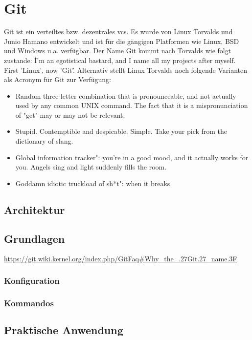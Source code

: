 \chapter{Git}\label{cha:Git}
Git ist ein verteiltes bzw. dezentrales \acrlong{vcs}. Es wurde von Linux
Torvalds und Junio Hamano entwickelt und ist für die gängigen Platformen wie
Linux, BSD und Windows u.a. verfügbar. Der Name Git kommt nach Torvalds wie
folgt zustande: \`I'm an egotistical bastard, and I name all my projects after
myself. First 'Linux', now 'Git'\'. Alternativ stellt Linux Torvalds noch
folgende Varianten als Acronym für Git zur Verfügung\cite{link:gitfaq}:

\begin{itemize}
  \item \glqq{} Random three-letter combination that is pronounceable, and not
  actually used by any common UNIX command. The fact that it is a
  mispronunciation of "get" may or may not be relevant.\grqq{}
  \item \glqq{} Stupid. Contemptible and despicable. Simple. Take your pick from the
  dictionary of slang.\grqq{}
  \item \glqq{} Global information tracker": you're in a good mood, and it actually
  works for you. Angels sing and light suddenly fills the room.\grqq{}
  \item \glqq{} Goddamn idiotic truckload of sh*t": when it breaks\grqq{}
\end{itemize}
\section{Architektur}
\label{sec:Architektur}
\section{Grundlagen}
\label{sec:Grundlagen}


\url{https://git.wiki.kernel.org/index.php/GitFaq#Why_the_.27Git.27_name.3F}
\subsection{Konfiguration}
\label{sec:Konfiguration}
\subsection{Kommandos}
\label{sec:Kommandos}
\section{Praktische Anwendung}
\label{sec:Praxis}
